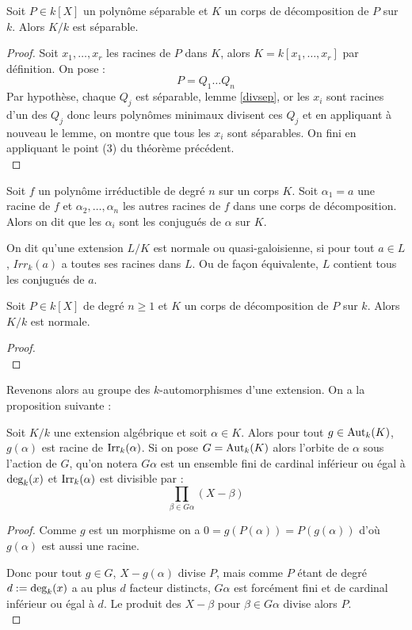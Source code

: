 \documentclass[a4paper]{article} %
\numberwithin{section}{part}
\numberwithin{equation}{section}
\newcommand\Irr[2]{\textup{Irr}_{#1}(#2)}
\begin{document}
\begin{cor}
Soit $P\in k[X]$ un polynôme séparable et $K$ un corps de
décomposition de $P$ sur $k$. Alors $K/k$ est séparable.
\end{cor}
\begin{proof}
Soit $x_1,\dots,x_r$ les racines de $P$ dans $K$, alors $K = k[x_1,\dots,x_r]$
par définition. On pose :
\[P = Q_1\dots Q_n\]
Par hypothèse, chaque $Q_j$ est séparable, lemme \ref{divsep}, or les $x_i$ sont
racines d'un des $Q_j$ donc leurs polynômes minimaux divisent ces $Q_j$ et en
appliquant à nouveau le lemme, on montre que tous les $x_i$ sont séparables. On
fini en appliquant le point (3) du théorème précédent.\\
\end{proof}

Soit $f$ un polynôme irréductible de degré $n$ sur un corps $K$. Soit $\alpha_1 
= a$ une racine de $f$ et $\alpha_2,\dots,\alpha_n$ les autres racines de $f$ 
dans une corps de décomposition. Alors on dit que les $\alpha_i$ sont les 
conjugués de $\alpha$ sur $K$.
\begin{defn}
On dit qu'une extension $L/K$ est normale ou quasi-galoisienne, si pour tout
$a\in L$, $Irr_k(a)$ a toutes ses racines dans $L$. Ou de façon équivalente, $L$
contient tous les conjugués de $a$.
\end{defn}

\begin{prop}
Soit $P\in k[X]$ de degré $n\geq 1$ et $K$ un corps de décomposition de $P$ sur
$k$. Alors $K/k$ est normale.
\end{prop}
\begin{proof}
\cite[Chap. VIII, p.~167]{Pol}\\
\end{proof}

Revenons alors au groupe des $k$-automorphismes d'une extension. On a la
proposition suivante :

\begin{prop}
Soit $K/k$ une extension algébrique et soit $\alpha\in K$. Alors pour tout
$g\in\textup{Aut}_k(K)$, $g(\alpha)$ est racine de $\Irr{k}{\alpha}$. Si on
pose $G = \textup{Aut}_k(K)$ alors l'orbite de $\alpha$ sous l'action de $G$,
qu'on notera $G\alpha$ est un ensemble fini de cardinal inférieur ou égal à
$\textup{deg}_k(x)$ et $\Irr{k}{\alpha}$ est divisible par :
\[\prod_{\beta\in G\alpha}{(X - \beta)}\]
\end{prop}
\begin{proof}
Comme $g$ est un morphisme on a $0 = g(P(\alpha)) = P(g(\alpha))$ d'où
$g(\alpha)$ est aussi une racine.\par
Donc pour tout $g\in G$, $X - g(\alpha)$ divise $P$, mais comme $P$ étant de
degré $d := \textup{deg}_k(x)$ a au plus $d$ facteur distincts, $G\alpha$ est 
forcément fini et de cardinal inférieur ou égal à $d$. Le produit des $X -
\beta$ pour $\beta\in G\alpha$ divise alors $P$.\\
\end{proof}
\end{document}
